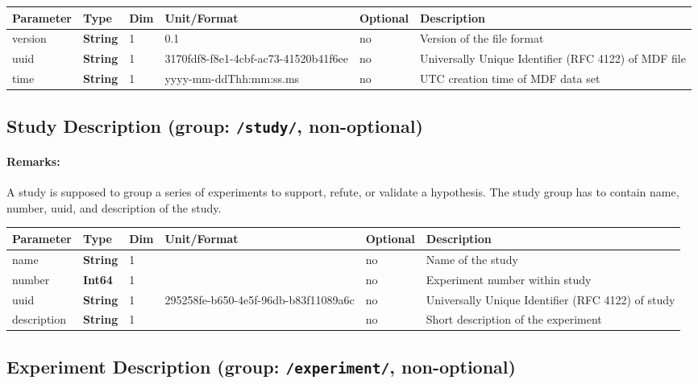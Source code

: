 \documentclass[landscape,a4paper]{article} %
\newcommand{\inl}[1]{\lstinline[columns=fixed]{#1}}
\newcommand{\inltab}[1]{{\ttfamily\bfseries\color{blue}#1}}
\newcommand{\inlvar}[1]{{\ttfamily#1}}
\begin{document}
\noindent \begin{tabularx}{\columnwidth}{lllllX} 
\textbf{Parameter} & \textbf{Type} & \textbf{Dim} & \textbf{Unit/Format} & \textbf{Optional} & \textbf{Description} \\ \hline 
\inlvar{version} & \inltab{String} & 1 & 0.1 & no & Version of the file format \\ \hline
\inlvar{uuid} & \inltab{String} & 1 & 3170fdf8-f8e1-4cbf-ac73-41520b41f6ee & no & Universally Unique Identifier (RFC 4122) of MDF file \\ \hline 
\inlvar{time} & \inltab{String} & 1 & yyyy-mm-ddThh:mm:ss.ms & no & UTC creation time of MDF data set \\ \hline
\end{tabularx}


\subsection{Study Description (group: \inl{/study/}, non-optional)}

\begin{multicols}{2}
	\paragraph{Remarks:} A study is supposed to group a series of experiments to support, refute, or validate a hypothesis. The study group has to contain \inlvar{name}, \inlvar{number}, \inlvar{uuid}, and \inlvar{description} of the study.
\end{multicols}

\noindent \begin{tabularx}{\columnwidth}{lllllX} 
\textbf{Parameter} & \textbf{Type} & \textbf{Dim} & \textbf{Unit/Format} & \textbf{Optional} & \textbf{Description} \\ \hline 
\inlvar{name} & \inltab{String} & 1 & & no & Name of the study \\ \hline
\inlvar{number} & \inltab{Int64} & 1 & & no & Experiment number within study \\ \hline
\inlvar{uuid} & \inltab{String} & 1 & 295258fe-b650-4e5f-96db-b83f11089a6c & no & Universally Unique Identifier (RFC 4122) of study \\ \hline 
\inlvar{description} & \inltab{String} & 1 & & no & Short description of the experiment \\ \hline
\end{tabularx}


\subsection{Experiment Description (group: \inl{/experiment/}, non-optional)}
\end{document}
